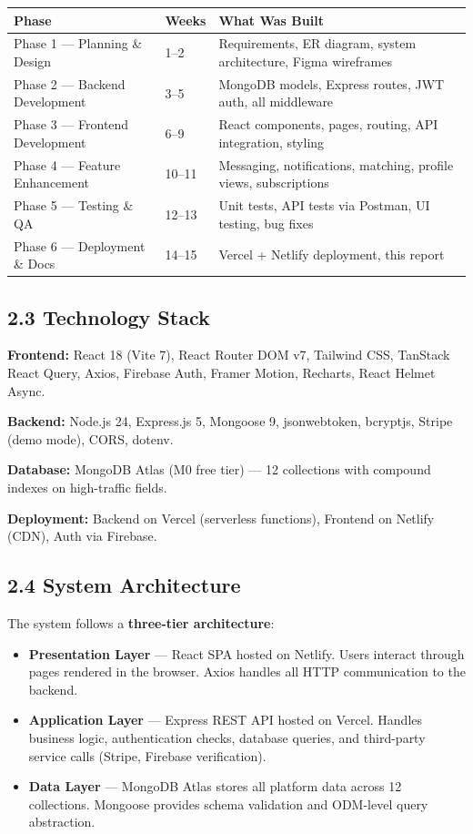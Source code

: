 \documentclass[conference]{IEEEtran}
\begin{document}
\begin{table}[htbp]
\centering
\footnotesize
\renewcommand{\arraystretch}{1.3}
\begin{tabularx}{\columnwidth}{|l|l|X|}
\hline
\textbf{Phase} & \textbf{Weeks} & \textbf{What Was Built} \\ \hline
Phase 1 --- Planning \& Design & 1--2 & Requirements, ER diagram, system architecture, Figma wireframes \\ \hline
Phase 2 --- Backend Development & 3--5 & MongoDB models, Express routes, JWT auth, all middleware \\ \hline
Phase 3 --- Frontend Development & 6--9 & React components, pages, routing, API integration, styling \\ \hline
Phase 4 --- Feature Enhancement & 10--11 & Messaging, notifications, matching, profile views, subscriptions \\ \hline
Phase 5 --- Testing \& QA & 12--13 & Unit tests, API tests via Postman, UI testing, bug fixes \\ \hline
Phase 6 --- Deployment \& Docs & 14--15 & Vercel + Netlify deployment, this report \\ \hline
\end{tabularx}
\end{table}

\subsection*{2.3 Technology Stack}
\textbf{Frontend:} React 18 (Vite 7), React Router DOM v7, Tailwind CSS, TanStack React Query, Axios, Firebase Auth, Framer Motion, Recharts, React Helmet Async.

\textbf{Backend:} Node.js 24, Express.js 5, Mongoose 9, jsonwebtoken, bcryptjs, Stripe (demo mode), CORS, dotenv.

\textbf{Database:} MongoDB Atlas (M0 free tier) --- 12 collections with compound indexes on high-traffic fields.

\textbf{Deployment:} Backend on Vercel (serverless functions), Frontend on Netlify (CDN), Auth via Firebase.

\subsection*{2.4 System Architecture}
The system follows a \textbf{three-tier architecture}:

\begin{itemize}
    \item \textbf{Presentation Layer} --- React SPA hosted on Netlify. Users interact through pages rendered in the browser. Axios handles all HTTP communication to the backend.
    \item \textbf{Application Layer} --- Express REST API hosted on Vercel. Handles business logic, authentication checks, database queries, and third-party service calls (Stripe, Firebase verification).
    \item \textbf{Data Layer} --- MongoDB Atlas stores all platform data across 12 collections. Mongoose provides schema validation and ODM-level query abstraction.
\end{itemize}
\end{document}
